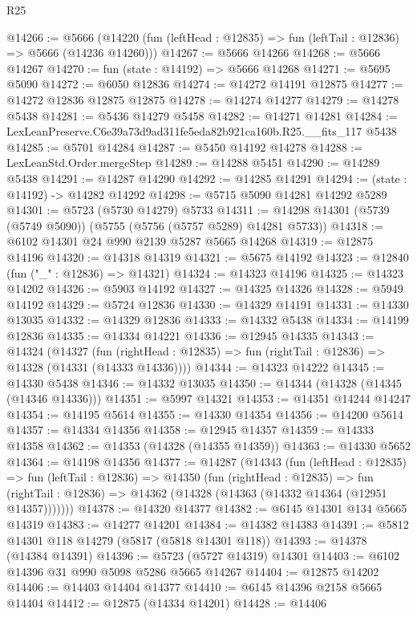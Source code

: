 \begin{lexlean}{R25}
\begin{coremodule}
@14266 := @5666
    (@14220 (fun (leftHead : @12835) => fun (leftTail : @12836) => @5666 (@14236 @14260)))
@14267 := @5666 @14266
@14268 := @5666 @14267
@14270 := fun (state : @14192) => @5666 @14268
@14271 := @5695 @5090
@14272 := @6050 @12836
@14274 := @14272 @14191 @12875
@14277 := @14272 @12836 @12875 @12875
@14278 := @14274 @14277
@14279 := @14278 @5438
@14281 := @5436 @14279 @5458
@14282 := @14271 @14281
@14284 := LexLeanPreserve.C6e39a73d9ad311fe5eda82b921ca160b.R25.__fits_117 @5438
@14285 := @5701 @14284
@14287 := @5450 @14192 @14278
@14288 := LexLeanStd.Order.mergeStep
@14289 := @14288 @5451
@14290 := @14289 @5438
@14291 := @14287 @14290
@14292 := @14285 @14291
@14294 := (state : @14192) -> @14282 @14292
@14298 := @5715 @5090 @14281 @14292 @5289
@14301 := @5723 (@5730 @14279) @5733
@14311 := @14298 @14301 (@5739 (@5749 @5090)) (@5755 (@5756 (@5757 @5289) @14281 @5733))
@14318 := @6102 @14301 @24 @990 @2139 @5287 @5665 @14268
@14319 := @12875 @14196
@14320 := @14318 @14319
@14321 := @5675 @14192
@14323 := @12840 (fun ("_" : @12836) => @14321)
@14324 := @14323 @14196
@14325 := @14323 @14202
@14326 := @5903 @14192
@14327 := @14325 @14326
@14328 := @5949 @14192
@14329 := @5724 @12836
@14330 := @14329 @14191
@14331 := @14330 @13035
@14332 := @14329 @12836
@14333 := @14332 @5438
@14334 := @14199 @12836
@14335 := @14334 @14221
@14336 := @12945 @14335
@14343 := @14324
    (@14327
      (fun (rightHead : @12835) => fun (rightTail : @12836) => @14328 (@14331 (@14333 @14336))))
@14344 := @14323 @14222
@14345 := @14330 @5438
@14346 := @14332 @13035
@14350 := @14344 (@14328 (@14345 (@14346 @14336)))
@14351 := @5997 @14321
@14353 := @14351 @14244 @14247
@14354 := @14195 @5614
@14355 := @14330 @14354
@14356 := @14200 @5614
@14357 := @14334 @14356
@14358 := @12945 @14357
@14359 := @14333 @14358
@14362 := @14353 (@14328 (@14355 @14359))
@14363 := @14330 @5652
@14364 := @14198 @14356
@14377 := @14287
    (@14343
      (fun (leftHead : @12835) =>
      fun (leftTail : @12836) =>
      @14350
        (fun (rightHead : @12835) =>
        fun (rightTail : @12836) => @14362 (@14328 (@14363 (@14332 @14364 (@12951 @14357)))))))
@14378 := @14320 @14377
@14382 := @6145 @14301 @134 @5665 @14319
@14383 := @14277 @14201
@14384 := @14382 @14383
@14391 := @5812 @14301 @118 @14279 (@5817 (@5818 @14301 @118))
@14393 := @14378 (@14384 @14391)
@14396 := @5723 (@5727 @14319) @14301
@14403 := @6102 @14396 @31 @990 @5098 @5286 @5665 @14267
@14404 := @12875 @14202
@14406 := @14403 @14404 @14377
@14410 := @6145 @14396 @2158 @5665 @14404
@14412 := @12875 (@14334 @14201)
@14428 := @14406

\end{coremodule}
\end{lexlean}
